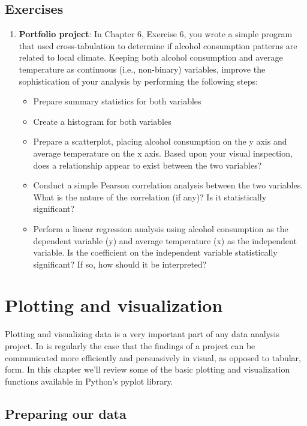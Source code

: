 \documentclass{book}
\begin{document}
\section{Exercises}
\begin{enumerate}
	\item \textbf{Portfolio project}: In Chapter 6, Exercise 6, you wrote a simple program that used cross-tabulation to determine if alcohol consumption patterns are related to local climate. Keeping both alcohol consumption and average temperature as continuous (i.e., non-binary) variables, improve the sophistication of your analysis by performing the following steps:
	\begin{itemize}
		\item Prepare summary statistics for both variables
		\item Create a histogram for both variables
		\item Prepare a scatterplot, placing alcohol consumption on the y axis and average temperature on the x axis. Based upon your visual inspection, does a relationship appear to exist between the two variables?
		\item Conduct a simple Pearson correlation analysis between the two variables. What is the nature of the correlation (if any)? Is it statistically significant?
		\item Perform a linear regression analysis using alcohol consumption as the dependent variable (y) and average temperature (x) as the independent variable. Is the coefficient on the independent variable statistically significant? If so, how should it be interpreted?	
	\end{itemize}
\end{enumerate}

\chapter{Plotting and visualization}

Plotting and visualizing data is a very important part of any data analysis project. In is regularly the case that the findings of a project can be communicated more efficiently and persuasively in visual, as opposed to tabular, form. In this chapter we'll review some of the basic plotting and visualization functions available in Python's pyplot library.

\section{Preparing our data}
\end{document}
